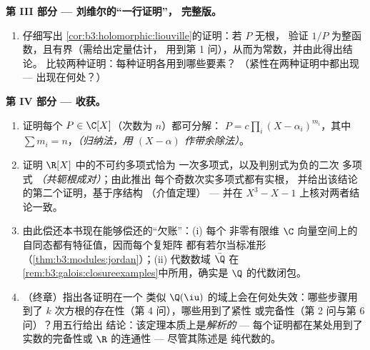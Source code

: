\begin{problem}
\medskip
\noindent\textbf{第 III 部分 --- 刘维尔的“一行证明”，
完整版。}
\begin{enumerate}[resume]
  \item 仔细写出
        \cref{cor:b3:holomorphic:liouville}的证明：若 $P$ 无根，
        验证 $1/P$ 为整函数，且有界（需给出定量估计，
        用到第 1 问），从而为常数，并由此得出结论。
        比较两种证明：每种证明各用到哪些要素？
        （紧性在两种证明中都出现 --- 出现在何处？）
\end{enumerate}

\medskip
\noindent\textbf{第 IV 部分 --- 收获。}
\begin{enumerate}[resume]
  \item 证明每个 $P \in \C[X]$（次数为 $n$）都可分解：
        $P = c\prod_{i}(X - \alpha_i)^{m_i}$，其中 $\sum m_i =
        n$，\emph{（归纳法，用 $(X -
        \alpha)$ 作带余除法）}。
  \item 证明 $\R[X]$ 中的不可约多项式恰为
        一次多项式，以及判别式为负的二次
        多项式 \emph{（共轭根成对）}；由此推出
        每个奇数次实多项式都有实根，
        并给出该结论的第二个证明，基于序结构
        （介值定理） ---
        并在 $X^3 - X - 1$ 上核对两者结论一致。
  \item 由此偿还本书现在能够偿还的“欠账”：(i) 每个
        非零有限维
        $\C$ 向量空间上的自同态都有特征值，因而每个复矩阵
        都有若尔当标准形
        （\cref{thm:b3:modules:jordan}）；(ii) 代数数域
        $\bar\Q$ 在
        \cref{rem:b3:galois:closureexamples}中所用，确实是
        $\Q$ 的代数闭包。
  \item （终章）指出各证明在一个
        类似 $\Q(\iu)$ 的域上会在何处失效：哪些步骤用到了
        $k$ 次方根的存在性（第 4 问），哪些用到了紧性
        或完备性（第 2 问与第 6 问）？用五行给出
        结论：该定理本质上是\emph{解析的} ---
        每个证明都在某处用到了实数的完备性或
        $\R$ 的连通性 --- 尽管其陈述是
        纯代数的。
\end{enumerate}


\end{problem}

